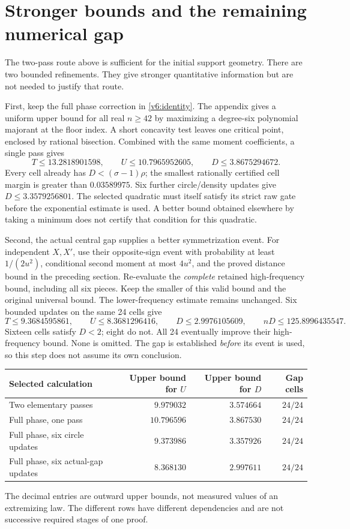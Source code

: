 \section{Stronger bounds and the remaining numerical gap}

The two-pass route above is sufficient for the initial support geometry.
There are two bounded refinements. They give stronger quantitative
information but are not needed to justify that route.

First, keep the full phase correction in \eqref{v6:identity}. The
appendix gives a uniform upper bound for all real $n\ge42$ by maximizing
a degree-six polynomial majorant at the floor index. A short concavity test
leaves one critical point, enclosed by rational bisection. Combined with
the same moment coefficients, a single pass gives
\[
 T\le13.2818901598,\qquad U\le10.7965952605,\qquad
 D\le3.8675294672.
\]
Every cell already has $D<(\sigma-1)\rho$; the smallest rationally
certified cell margin is greater than $0.03589975$.
Six further circle/density updates give $D\le3.3579256801$.
The selected quadratic must itself satisfy its strict raw gate before
the exponential estimate is used. A better bound obtained elsewhere by
taking a minimum does not certify that condition for this quadratic.

Second, the actual central gap supplies a better symmetrization event.
For independent $X,X'$, use their opposite-sign event with probability
at least $1/(2u^2)$, conditional second moment at most $4u^2$, and the
proved distance bound in the preceding section. Re-evaluate the
\emph{complete} retained high-frequency bound, including all six pieces.
Keep the smaller of this valid bound and the original universal bound.
The lower-frequency estimate remains unchanged. Six bounded updates on
the same 24 cells give
\[
 T\le9.3684595861,\qquad U\le8.3681296416,\qquad
 D\le2.9976105609,\qquad nD\le125.8996435547.
\]
Sixteen cells satisfy $D<2$; eight do not. All 24 eventually improve
their high-frequency bound. None is omitted. The gap is established
\emph{before} its event is used, so this step does not assume its own
conclusion.

\begin{center}
\begin{tabular}{@{}lrrr@{}}
\toprule
Selected calculation & Upper bound for $U$ & Upper bound for $D$ & Gap cells\\
\midrule
Two elementary passes & $9.979032$ & $3.574664$ & $24/24$\\
Full phase, one pass & $10.796596$ & $3.867530$ & $24/24$\\
Full phase, six circle updates & $9.373986$ & $3.357926$ & $24/24$\\
Full phase, six actual-gap updates & $8.368130$ & $2.997611$ & $24/24$\\
\bottomrule
\end{tabular}
\end{center}
The decimal entries are outward upper bounds, not measured values of an
extremizing law. The different rows have different dependencies and are
not successive required stages of one proof.

